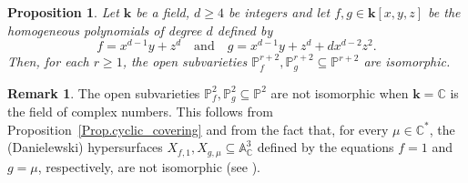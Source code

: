 \documentclass[JEP,XML,SOM,Unicode,NoFloatCountersInSection,published]{cedram}
\newcommand\quand{\quad\text{and}\quad}
\newtheorem{proposition}[lemma]{Proposition}
\theoremstyle{definition}
\newtheorem{remark}[lemma]{Remark}
\newcommand\A{{\mathbb A}}\let\AA\A
\newcommand\C{{\mathbb C}}\let\CC\C
\renewcommand\k{{\mathbf k}}
\newcommand\p{{\mathbb P}}\let\PP\p
\newcommand{\kk}{\mathbf{k}}
\begin{document}
\begin{proposition}\label{Prop.Counterexample.dim3}Let $\kk$ be a field, $d\ge 4$ be integers and let $f,g\in\k[x,y,z]$ be the homogeneous polynomials of degree $d$ defined by \[f=x^{d-1}y+z^{d} \quand g=x^{d-1}y+z^{d}+dx^{d-2}z^2.\] Then, for each $r\ge 1$, the
open subvarieties $\p^{r+2}_f,\p^{r+2}_g \subseteq \p^{r+2}$ are isomorphic.
\end{proposition}

\begin{remark}
The open subvarieties $\p^{2}_f,\p^{2}_g \subseteq \p^{2}$ are not isomorphic when $\kk=\mathbb{C}$ is the field of complex numbers. This follows from Proposition~\ref{Prop.cyclic_covering} and from the fact that, for every $\mu\in\C^*$, the (Danielewski) hypersurfaces $X_{f,1}, X_{g,\mu}\subseteq\A^3_{\mathbb{C}}$ defined by the equations $f=1$ and $g=\mu$, respectively, are not isomorphic (see \cite[Th.\,9]{PoloniClassifications}).
\end{remark}
\end{document}
